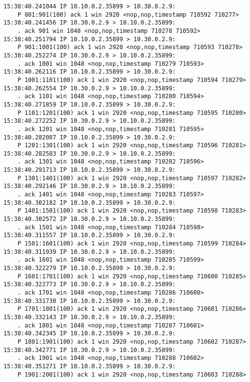 \documentclass[a4paper,12pt]{article}
\begin{document}
\begin{Verbatim}
15:38:40.241044 IP 10.10.0.2.35899 > 10.30.0.2.9: 
    P 801:901(100) ack 1 win 2920 <nop,nop,timestamp 710592 710277>
15:38:40.241456 IP 10.30.0.2.9 > 10.10.0.2.35899: 
    . ack 901 win 1048 <nop,nop,timestamp 710278 710592>
15:38:40.251794 IP 10.10.0.2.35899 > 10.30.0.2.9: 
    P 901:1001(100) ack 1 win 2920 <nop,nop,timestamp 710593 710278>
15:38:40.252274 IP 10.30.0.2.9 > 10.10.0.2.35899: 
    . ack 1001 win 1048 <nop,nop,timestamp 710279 710593>
15:38:40.262116 IP 10.10.0.2.35899 > 10.30.0.2.9: 
    P 1001:1101(100) ack 1 win 2920 <nop,nop,timestamp 710594 710279>
15:38:40.262554 IP 10.30.0.2.9 > 10.10.0.2.35899: 
    . ack 1101 win 1048 <nop,nop,timestamp 710280 710594>
15:38:40.271859 IP 10.10.0.2.35899 > 10.30.0.2.9: 
    P 1101:1201(100) ack 1 win 2920 <nop,nop,timestamp 710595 710280>
15:38:40.272252 IP 10.30.0.2.9 > 10.10.0.2.35899: 
    . ack 1201 win 1048 <nop,nop,timestamp 710281 710595>
15:38:40.282087 IP 10.10.0.2.35899 > 10.30.0.2.9: 
    P 1201:1301(100) ack 1 win 2920 <nop,nop,timestamp 710596 710281>
15:38:40.282583 IP 10.30.0.2.9 > 10.10.0.2.35899: 
    . ack 1301 win 1048 <nop,nop,timestamp 710282 710596>
15:38:40.291713 IP 10.10.0.2.35899 > 10.30.0.2.9: 
    P 1301:1401(100) ack 1 win 2920 <nop,nop,timestamp 710597 710282>
15:38:40.292146 IP 10.30.0.2.9 > 10.10.0.2.35899: 
    . ack 1401 win 1048 <nop,nop,timestamp 710283 710597>
15:38:40.302182 IP 10.10.0.2.35899 > 10.30.0.2.9: 
    P 1401:1501(100) ack 1 win 2920 <nop,nop,timestamp 710598 710283>
15:38:40.302572 IP 10.30.0.2.9 > 10.10.0.2.35899: 
    . ack 1501 win 1048 <nop,nop,timestamp 710284 710598>
15:38:40.311557 IP 10.10.0.2.35899 > 10.30.0.2.9: 
    P 1501:1601(100) ack 1 win 2920 <nop,nop,timestamp 710599 710284>
15:38:40.311939 IP 10.30.0.2.9 > 10.10.0.2.35899: 
    . ack 1601 win 1048 <nop,nop,timestamp 710285 710599>
15:38:40.322279 IP 10.10.0.2.35899 > 10.30.0.2.9: 
    P 1601:1701(100) ack 1 win 2920 <nop,nop,timestamp 710600 710285>
15:38:40.322773 IP 10.30.0.2.9 > 10.10.0.2.35899: 
    . ack 1701 win 1048 <nop,nop,timestamp 710286 710600>
15:38:40.331730 IP 10.10.0.2.35899 > 10.30.0.2.9: 
    P 1701:1801(100) ack 1 win 2920 <nop,nop,timestamp 710601 710286>
15:38:40.332143 IP 10.30.0.2.9 > 10.10.0.2.35899: 
    . ack 1801 win 1048 <nop,nop,timestamp 710287 710601>
15:38:40.342345 IP 10.10.0.2.35899 > 10.30.0.2.9: 
    P 1801:1901(100) ack 1 win 2920 <nop,nop,timestamp 710602 710287>
15:38:40.342771 IP 10.30.0.2.9 > 10.10.0.2.35899: 
    . ack 1901 win 1048 <nop,nop,timestamp 710288 710602>
15:38:40.351271 IP 10.10.0.2.35899 > 10.30.0.2.9: 
    P 1901:2001(100) ack 1 win 2920 <nop,nop,timestamp 710603 710288>

\end{Verbatim}
\end{document}

